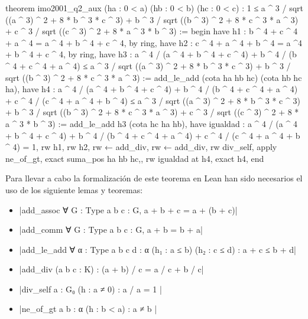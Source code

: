 \begin{leancode}
theorem imo2001_q2_aux
  (ha : 0 < a)
  (hb : 0 < b)
  (hc : 0 < c)
  : 1 ≤ a ^ 3 / sqrt ((a ^ 3) ^ 2 + 8 * b ^ 3 * c ^ 3) +
        b ^ 3 / sqrt ((b ^ 3) ^ 2 + 8 * c ^ 3 * a ^ 3) +
        c ^ 3 / sqrt ((c ^ 3) ^ 2 + 8 * a ^ 3 * b ^ 3) :=
begin
  have h1 : b ^ 4 + c ^ 4 + a ^ 4 = a ^ 4 + b ^ 4 + c ^ 4,
    by ring,
  have h2 : c ^ 4 + a ^ 4 + b ^ 4 = a ^4 + b ^ 4 + c ^ 4,
    by ring,
  have h3 : a ^ 4 / (a ^ 4 + b ^ 4 + c ^ 4) +
            b ^ 4 / (b ^ 4 + c ^ 4 + a ^ 4) ≤
            a ^ 3 / sqrt ((a ^ 3) ^ 2 + 8 * b ^ 3 * c ^ 3) +
            b ^ 3 / sqrt ((b ^ 3) ^ 2 + 8 * c ^ 3 * a ^ 3) :=
    add_le_add (cota ha hb hc) (cota hb hc ha),
  have h4 : a ^ 4 / (a ^ 4 + b ^ 4 + c ^ 4) +
            b ^ 4 / (b ^ 4 + c ^ 4 + a ^ 4) +
            c ^ 4 / (c ^ 4 + a ^ 4 + b ^ 4) ≤
            a ^ 3 / sqrt ((a ^ 3) ^ 2 + 8 * b ^ 3 * c ^ 3) +
            b ^ 3 / sqrt ((b ^ 3) ^ 2 + 8 * c ^ 3 * a ^ 3) +
            c ^ 3 / sqrt ((c ^ 3) ^ 2 + 8 * a ^ 3 * b ^ 3) :=
    add_le_add h3 (cota hc ha hb),
  have igualdad : a ^ 4 / (a ^ 4 + b ^ 4 + c ^ 4) +
                  b ^ 4 / (b ^ 4 + c ^ 4 + a ^ 4) +
                  c ^ 4 / (c ^ 4 + a ^ 4 + b ^ 4) = 1,
    { rw h1,
      rw h2,
      rw ← add_div,
      rw ← add_div,
      rw div_self,
      apply ne_of_gt,
      exact suma_pos ha hb hc,},
  rw igualdad at h4,
  exact h4,
end
\end{leancode}

Para llevar a cabo la formalización de este teorema en Lean han sido
necesarios el uso de los siguiente lemas y teoremas:
\begin{itemize}
\item {}|add_assoc ∀ {G : Type} {a b c : G}, a + b + c = a + (b + c)|
\item {}|add_comm ∀ {G : Type} {a b c : G}, a + b  = b + a|
\item {}|add_le_add ∀ {α : Type} {a b c d : α} (h₁ : a ≤ b) (h₂ : c ≤ d) : a + c ≤ b + d|
\item {}|add_div (a b c : K) : (a + b) / c = a / c + b / c|
\item {}|div_self {a : G₀} (h : a ≠ 0) : a / a = 1 |
\item {}|ne_of_gt {a b : α} (h : b < a) : a ≠ b |
\end{itemize}

